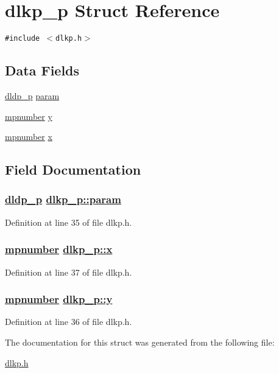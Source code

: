 \hypertarget{structdlkp__p}{
\section{dlkp\_\-p Struct Reference}
\label{structdlkp__p}
}
{\tt \#include $<$dlkp.h$>$}

\subsection*{Data Fields}
\begin{CompactItemize}
\item 
\hyperlink{structdldp__p}{dldp\_\-p} \hyperlink{structdlkp__p_o0}{param}
\item 
\hyperlink{structmpnumber}{mpnumber} \hyperlink{structdlkp__p_o1}{y}
\item 
\hyperlink{structmpnumber}{mpnumber} \hyperlink{structdlkp__p_o2}{x}
\end{CompactItemize}


\subsection{Field Documentation}
\hypertarget{structdlkp__p_o0}{
\subsubsection[param]{\setlength{\rightskip}{0pt plus 5cm}\hyperlink{structdldp__p}{dldp\_\-p} \hyperlink{structdlkp__p_o0}{dlkp\_\-p::param}}}
\label{structdlkp__p_o0}


Definition at line 35 of file dlkp.h.\hypertarget{structdlkp__p_o2}{
\subsubsection[x]{\setlength{\rightskip}{0pt plus 5cm}\hyperlink{structmpnumber}{mpnumber} \hyperlink{structdlkp__p_o2}{dlkp\_\-p::x}}}
\label{structdlkp__p_o2}


Definition at line 37 of file dlkp.h.\hypertarget{structdlkp__p_o1}{
\subsubsection[y]{\setlength{\rightskip}{0pt plus 5cm}\hyperlink{structmpnumber}{mpnumber} \hyperlink{structdlkp__p_o1}{dlkp\_\-p::y}}}
\label{structdlkp__p_o1}


Definition at line 36 of file dlkp.h.

The documentation for this struct was generated from the following file:\begin{CompactItemize}
\item 
\hyperlink{dlkp_8h}{dlkp.h}\end{CompactItemize}
